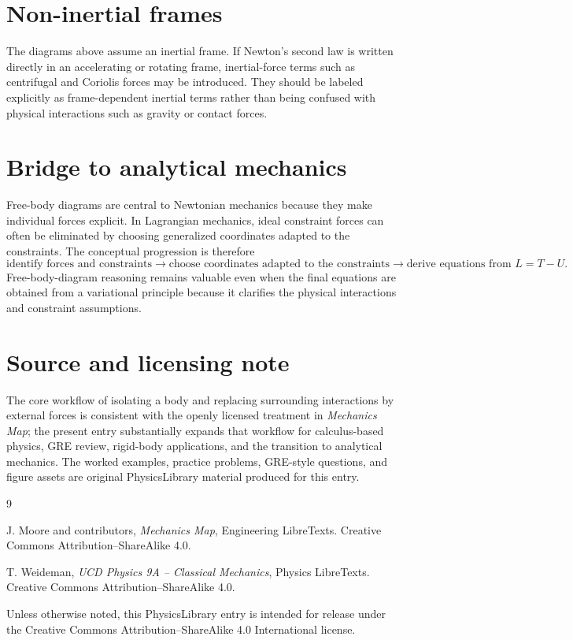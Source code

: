 \section{Non-inertial frames}

The diagrams above assume an inertial frame.  If Newton's second law is written directly in an
accelerating or rotating frame, inertial-force terms such as centrifugal and Coriolis forces may be
introduced.  They should be labeled explicitly as frame-dependent inertial terms rather than being
confused with physical interactions such as gravity or contact forces.

\section{Bridge to analytical mechanics}

Free-body diagrams are central to Newtonian mechanics because they make individual forces explicit.
In Lagrangian mechanics, ideal constraint forces can often be eliminated by choosing generalized
coordinates adapted to the constraints.  The conceptual progression is therefore
\[
\text{identify forces and constraints}
\longrightarrow
\text{choose coordinates adapted to the constraints}
\longrightarrow
\text{derive equations from }L=T-U.
\]
Free-body-diagram reasoning remains valuable even when the final equations are obtained from a
variational principle because it clarifies the physical interactions and constraint assumptions.

\section{Source and licensing note}

The core workflow of isolating a body and replacing surrounding interactions by external forces is
consistent with the openly licensed treatment in \emph{Mechanics Map}; the present entry substantially
expands that workflow for calculus-based physics, GRE review, rigid-body applications, and the
transition to analytical mechanics.  The worked examples, practice problems, GRE-style questions,
and figure assets are original PhysicsLibrary material produced for this entry.

\begin{thebibliography}{9}

J. Moore and contributors,
\emph{Mechanics Map}, Engineering LibreTexts.
Creative Commons Attribution--ShareAlike 4.0.

T. Weideman,
\emph{UCD Physics 9A -- Classical Mechanics}, Physics LibreTexts.
Creative Commons Attribution--ShareAlike 4.0.

\end{thebibliography}

Unless otherwise noted, this PhysicsLibrary entry is intended for release under the Creative Commons
Attribution--ShareAlike 4.0 International license.
